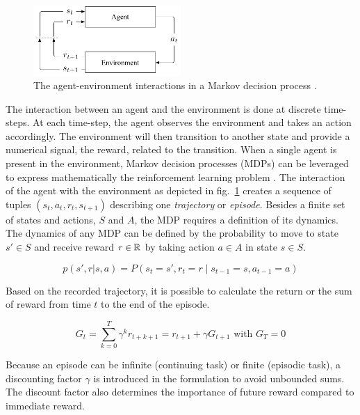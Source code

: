 \begin{figure}
\centering
\includegraphics[width=0.5\textwidth]{imgs/rl-env.png}
\caption[The agent-environment interactions in a Markov decision process]{The agent-environment interactions in a Markov decision process \protect\footnotemark.}
\label{fig:agent-env-interaction}
\end{figure}




The interaction between an agent and the environment is done at discrete time-steps. At each time-step, the agent observes the environment and takes an action accordingly. The environment will then transition to another state and provide a numerical signal, the reward, related to the transition. When a single agent is present in the environment, Markov decision processes (MDPs) can be leveraged to express mathematically the reinforcement learning problem \cite{puterman_markov_1995}. The interaction of the agent with the environment as depicted in fig.~\ref{fig:agent-env-interaction} creates a sequence of tuples $(s_t, a_t, r_t, s_{t+1})$ describing one \textit{trajectory} or \textit{episode}. Besides a finite set of states and actions, $S$ and $A$, the MDP requires a definition of its dynamics. The dynamics of any MDP can be defined by the probability to move to state $s' \in S$ and receive reward $r \in \mathbb{R}$ by taking action $a \in A$ in state $s \in S$.

$$p(s', r | s, a) = P(s_{t}=s', r_{t}=r \mid s_{t-1}=s, a_{t-1}=a)$$

Based on the recorded trajectory, it is possible to calculate the return or the sum of reward from time $t$ to the end of the episode.

$$G_t=\sum_{k=0}^{T} \gamma^{k} r_{t+k+1} = r_{t+1} + \gamma G_{t+1} \text{ with } G_T=0$$

Because an episode can be infinite (continuing task) or finite (episodic task), a discounting factor $\gamma$ is introduced in the formulation to avoid unbounded sums. The discount factor also determines the importance of future reward compared to immediate reward. 

